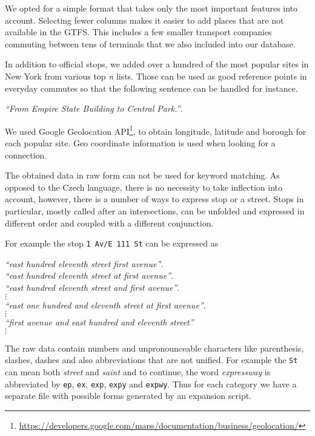 We opted for a simple format that takes only the most important features into account.
Selecting fewer columns makes it easier to add places that are not available in the GTFS.
This includes a few smaller transport companies commuting between tens of terminals that we also included into our database.

In addition to official stops, we added over a hundred of the most popular sites in New York from various top \textit{n} lists.
Those can be used as good reference points in everyday commutes so that the following sentence can be handled for instance.

\begin{flushleft}
\textit{``From Empire State Building to Central Park.''}.
\end{flushleft}

\noindent We used Google Geolocation API\footnote{\url{https://developers.google.com/maps/documentation/business/geolocation/}}, to obtain longitude, latitude and borough for each popular site. Geo coordinate information is used when looking for a connection.

The obtained data in raw form can not be used for keyword matching. As opposed to the Czech language, there is no necessity to take inflection into account, however, there is a number of ways to express stop or a street.
Stops in particular, mostly called after an intersections, can be unfolded and expressed in different order and coupled with a different conjunction.

For example the stop \texttt{1 Av/E 111 St} can be expressed as
\begin{flushleft}
\textit{``east hundred eleventh street first avenue''}. \\
\textit{``east hundred eleventh street at first avenue''}. \\
\textit{``east hundred eleventh street and first avenue''}. \\
\hspace{8em} $\vdots$ \\
\textit{``east one hundred and eleventh street at first avenue''}. \\
\hspace{8em} $\vdots$ \\
\textit{``first avenue and east hundred and eleventh street''} \\
\hspace{8em} $\vdots$
\end{flushleft}

The raw data contain numbers and unpronounceable characters like parenthesis, slashes, dashes and also abbreviations that are not unified.
For example the \texttt{St} can mean both \textit{street} and \textit{saint} and to continue, the word \textit{expressway} is abbreviated by \texttt{ep}, \texttt{ex}, \texttt{exp}, \texttt{expy} and \texttt{expwy}.
Thus for each category we have a separate file with possible forms generated by an expansion script.

